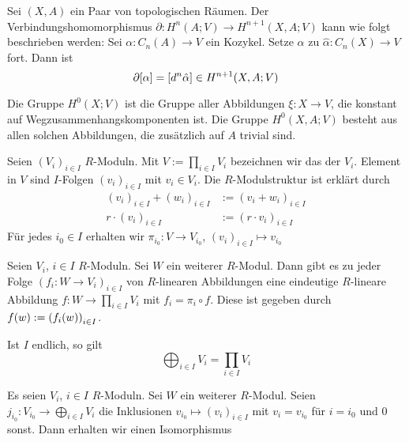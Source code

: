 \begin{bemerkung}
	Sei $(X,A)$ ein Paar von topologischen Räumen. Der Verbindungshomomorphismus $\partial \colon H^n(A;V) \to H^{n+1}(X,A;V)$ kann wie folgt beschrieben werden: Sei 
	$\alpha \colon C_n(A) \to V$ ein Kozykel. Setze $\alpha$ zu $\hat{\alpha} \colon C_n(X) \to V$ fort. Dann ist 
	\[
		\partial \benbrace{\alpha} = \benbrace*{d^n \hat{\alpha}} \in H^{n+1}(X,A;V)
	\]
\end{bemerkung}

\begin{beispiel}
	Die Gruppe $H^0(X;V)$ ist die Gruppe aller Abbildungen $\xi \colon X \to V$, die konstant auf Wegzusammenhangskomponenten ist. Die Gruppe $H^0(X,A;V)$ besteht aus allen 
	solchen Abbildungen, die zusätzlich auf $A$ trivial sind.
\end{beispiel}

\begin{definition}[{name=[Produkt von $R$-Moduln]}]
	Seien $(V_i)_{i \in I}$ $R$-Moduln. Mit $V := \prod_{i \in I} V_i$ bezeichnen wir das  der $V_i$. Element in $V$ sind $I$-Folgen $(v_i)_{i \in I}$ mit 
	$v_i \in V_i$. Die $R$-Modulstruktur ist erklärt durch
	\begin{align}
		(v_i)_{i \in I}+ (w_i)_{i \in I} &:= (v_i + w_i)_{i \in I} \\
		r \cdot (v_i)_{i \in I} &:= (r \cdot v_i)_{i \in I}
	\end{align}
	Für jedes $i_0 \in I$ erhalten wir $\pi_{i_0} \colon V \to V_{i_0}$, $(v_i)_{i \in I} \mapsto v_{i_0}$
\end{definition}

\begin{bemerkung}[name={Universelle Eigenschaft des Produktes}]
	Seien $V_i$, $i \in I$ $R$-Moduln. Sei $W$ ein weiterer $R$-Modul. Dann gibt es zu jeder Folge $(f_i \colon W \to V_i)_{i \in I}$ von $R$-linearen Abbildungen eine eindeutige 
	$R$-lineare Abbildung $f \colon W \to \prod_{i \in I}V_i$ mit $f_i= \pi_i \circ f$. Diese ist gegeben durch
	$f(w) := \enbrace*{f_i(w)}_{i \in I}$.
\end{bemerkung}

\begin{bemerkung}
	Ist $I$ endlich, so gilt
	\[
		\bigoplus_{i \in I} V_i = \prod_{i \in I} V_i
	\]
\end{bemerkung}

\begin{bemerkung}
	Es seien $V_i$, $i \in I$ $R$-Moduln. Sei $W$ ein weiterer $R$-Modul. Seien $j_{i_0} \colon V_{i_0} \to \bigoplus_{i \in I}V_i$ die Inklusionen $v_{i_0} \mapsto (v_i)_{i \in I}$
	mit $v_i =v_{i_0}$ für $i=i_0$ und $0$ sonst. Dann erhalten wir einen Isomorphismus
\end{bemerkung}

